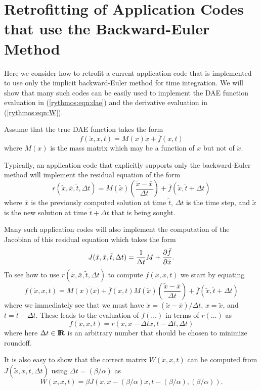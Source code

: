 \documentclass[pdf,ps2pdf,11pt]{SANDreport}
\begin{document}
\section{Retrofitting of Application Codes that use the Backward-Euler Method}

Here we consider how to retrofit a current application code that is
implemented to use only the implicit backward-Euler method for time
integration.  We will show that many such codes can be easily used to
implement the DAE function evaluation in (\ref{rythmos:eqn:dae}) and the
derivative evaluation in (\ref{rythmos:eqn:W}).

Assume that the true DAE function takes the form
%
\[
f(\dot{x},x,t) = M(x) \dot{x} + \bar{f}(x,t)
\]
%
where $M(x)$ is the mass matrix which may be a function of $x$ but not of
$\dot{x}$.

Typically, an application code that explicitly supports only the
backward-Euler method will implement the residual equation of the form
%
\[
r(\tilde{x},\bar{x},\tilde{t},\Delta t)
= M(\tilde{x})\left(\frac{\tilde{x}-\bar{x}}{\Delta t}\right)
+ \bar{f}(\tilde{x},\tilde{t} + \Delta t)
\]
%
where $\bar{x}$ is the previously computed solution at time $\tilde{t}$,
$\Delta t$ is the time step, and $\tilde{x}$ is the new solution at time
$\tilde{t} + {}\Delta t$ that is being sought.

Many such application codes will also implement the computation of the
Jacobian of this residual equation which takes the form
%
\[
J(\tilde{x},\bar{x},\tilde{t},\Delta t)
= \frac{1}{\Delta t} M + \displaystyle{\frac{\partial \bar{f}}{\partial \tilde{x}}}.
\]
%
To see how to use $r(\tilde{x},\bar{x},\tilde{t},\Delta t)$ to compute
$f(\dot{x},x,t)$ we start by equating
%
\[
f(\dot{x},x,t) = M(x) \dot(x) + \bar{f}(x,t)
M(\tilde{x})\left(\frac{\tilde{x}-\bar{x}}{\Delta t}\right)
+ \bar{f}(\tilde{x},\tilde{t} + \Delta t)
\]
%
where we immediately see that we must have $\dot{x} =
(\tilde{x}-\bar{x})/{\Delta t}$, $x=\tilde{x}$, and $t=\tilde{t}+\Delta t$.
These leads to the evaluation of $f(\ldots)$ in terms of $r(\ldots)$ as
%
\[
f(\dot{x},x,t)
= r(x, x - \Delta t \dot{x},t - \Delta t, \Delta t)
\]
%
where here $\Delta t\in\mbox{\textbf{I}}\hspace{-0.6ex}\mbox{\textbf{R}}$ is an arbitrary number that should be chosen to
minimize roundoff.

It is also easy to show that the correct matrix $W(\dot{x},x,t)$ can be
computed from $J(\tilde{x},\bar{x},\tilde{t},\Delta t)$ using $\Delta t =
(\beta/\alpha)$ as
%
\[
W(\dot{x},x,t)
= \beta J(x, x - (\beta/\alpha) \dot{x},t - (\beta/\alpha), (\beta/\alpha)).
\]
%
\end{document}
